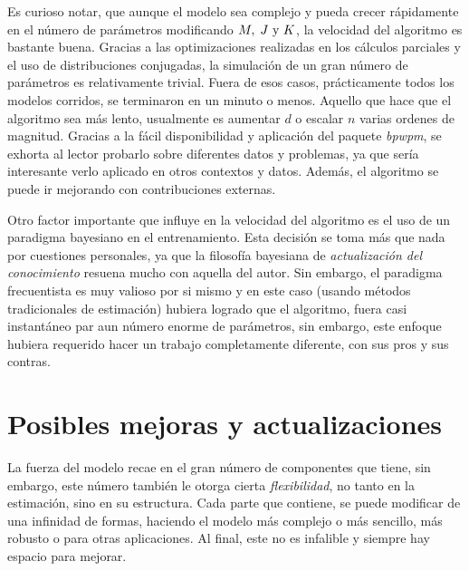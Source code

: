 \documentclass[../Main/Main.tex]{subfiles}
\begin{document}
Es curioso notar, que aunque el modelo sea complejo y pueda crecer rápidamente en el número de parámetros modificando $M,\;J\text{ y }K$, la velocidad del algoritmo es bastante buena. Gracias a las optimizaciones realizadas en los cálculos parciales y el uso de distribuciones conjugadas, la simulación de un gran número de parámetros es relativamente trivial. Fuera de esos casos, prácticamente todos los modelos corridos, se terminaron en un minuto o menos. Aquello que hace que el algoritmo sea más lento, usualmente es aumentar $d$ o escalar $n$ varias ordenes de magnitud. Gracias a la fácil disponibilidad y aplicación del paquete \textit{bpwpm}, se exhorta al lector probarlo sobre diferentes datos y problemas, ya que sería interesante verlo aplicado en otros contextos y datos. Además,  el algoritmo se puede ir mejorando con contribuciones externas.

Otro factor importante que influye en la velocidad del algoritmo es el uso de un paradigma bayesiano en el entrenamiento. Esta decisión se toma más que nada por cuestiones personales, ya que la filosofía bayesiana de \textit{actualización del conocimiento} resuena mucho con aquella del autor. Sin embargo, el paradigma frecuentista es muy valioso por si mismo y en este caso (usando métodos tradicionales de estimación) hubiera logrado que el algoritmo, fuera casi instantáneo par aun número enorme de parámetros, sin embargo, este enfoque hubiera requerido hacer un trabajo completamente diferente, con sus pros y sus contras. 

\section{Posibles mejoras y actualizaciones}
La fuerza del modelo recae en el gran número de componentes que tiene, sin embargo, este número también le otorga cierta \textit{flexibilidad}, no tanto en la estimación, sino en su estructura. Cada parte que contiene, se puede modificar de una infinidad de formas, haciendo el modelo más complejo o más sencillo, más robusto o para otras aplicaciones. Al final, este no es infalible y siempre hay espacio para mejorar.
\end{document}
